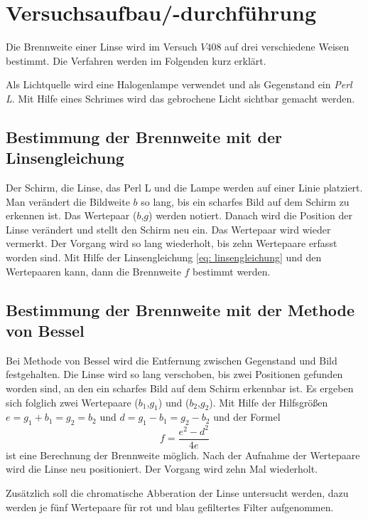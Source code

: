 \section{Versuchsaufbau/-durchführung}
Die Brennweite einer Linse wird im Versuch $V408$ auf drei
verschiedene Weisen bestimmt.
Die Verfahren werden im Folgenden kurz erklärt.

Als Lichtquelle wird eine Halogenlampe verwendet und als
Gegenstand ein \emph{Perl L}. Mit Hilfe eines Schrimes wird %
das gebrochene Licht sichtbar gemacht werden.

\subsection{Bestimmung der Brennweite mit der Linsengleichung} %

Der Schirm, die Linse, das Perl L und die Lampe werden auf einer
Linie platziert.
Man verändert die Bildweite $b$ so lang, bis ein scharfes Bild auf dem %
Schirm zu erkennen ist. Das Wertepaar ($b$,$g$) werden notiert.
Danach wird die Position der Linse verändert und stellt den Schirm neu ein. %
Das Wertepaar wird wieder vermerkt. Der Vorgang wird so lang wiederholt, bis
zehn Wertepaare erfasst worden sind. %
Mit Hilfe der Linsengleichung \eqref{eq: linsengleichung} und den Wertepaaren kann, dann die
Brennweite $f$ bestimmt werden. %

\subsection{Bestimmung der Brennweite mit der Methode von Bessel}
Bei Methode von Bessel wird die Entfernung zwischen %
Gegenstand und Bild festgehalten. Die Linse wird so lang verschoben, bis zwei
Positionen gefunden worden sind, an den ein scharfes Bild auf dem Schirm erkennbar ist.
Es ergeben sich folglich zwei Wertepaare ($b_1$,$g_1$) und ($b_2$,$g_2$).
Mit Hilfe der Hilfsgrößen $e=g_1+b_1=g_2=b_2$ und $d=g_1-b_1=g_2-b_2$ und der Formel %
\begin{equation}
  \label{eq: bessel_methode}
  f=\frac{e^2-d^2}{4e}
\end{equation}
ist eine Berechnung der Brennweite möglich.
Nach der Aufnahme der Wertepaare wird die Linse neu positioniert.
Der Vorgang wird zehn Mal wiederholt.

Zusätzlich soll die chromatische Abberation der Linse untersucht werden,
dazu werden je fünf Wertepaare für rot und blau gefiltertes Filter
aufgenommen.

